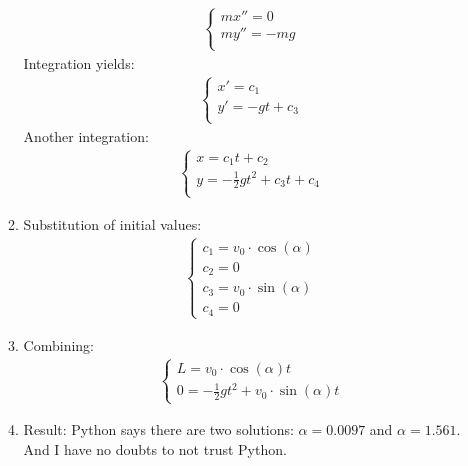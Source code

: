 \begin{enumerate}
\begin{enumerate}
                    \begin{align}
                        \begin{cases}
                            mx'' = 0   \\
                            my'' = -mg \\
                        \end{cases}
                    \end{align}
                    Integration yields:
                    \begin{align}
                        \begin{cases}
                            x' = c_1       \\
                            y' = -gt + c_3 \\
                        \end{cases}
                    \end{align}
                    Another integration: \\
                    \begin{align}
                        \begin{cases}
                            x = c_1 t + c_2                    \\
                            y = -\frac{1}{2}gt^2 + c_3 t + c_4 \\
                        \end{cases}
                    \end{align}
              \item Substitution of initial values:
                    \begin{align}
                        \begin{cases}
                            c_1 = v_0 \cdot \cos(\alpha) \\
                            c_2 = 0                      \\
                            c_3 = v_0 \cdot \sin(\alpha) \\
                            c_4 = 0
                        \end{cases}
                    \end{align}
              \item Combining:
                    \begin{align}
                        \begin{cases}
                            L = v_0 \cdot \cos(\alpha) t \\
                            0 = -\frac{1}{2}gt^2 + v_0 \cdot \sin(\alpha) t
                        \end{cases}
                    \end{align}
              \item Result:
                    Python says there are two solutions: $\alpha = 0.0097$ and $\alpha = 1.561$.
                    And I have no doubts to not trust Python.
          \end{enumerate}
\end{enumerate}

